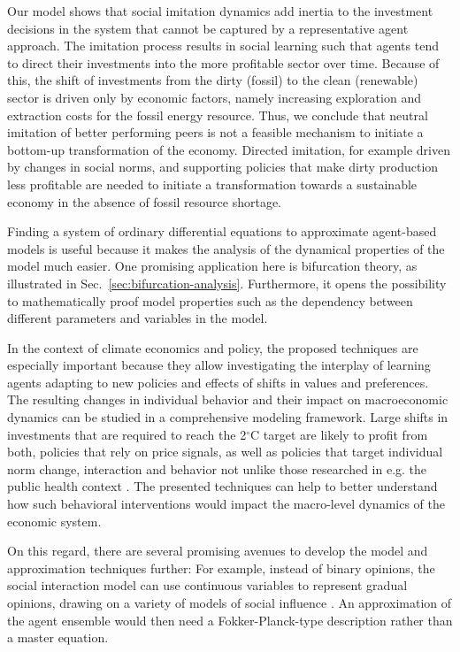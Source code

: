 Our model shows that social imitation dynamics add inertia to the investment decisions in the system that cannot be captured by a representative agent approach.
The imitation process results in social learning such that agents tend to direct their investments into the more profitable sector over time.
Because of this, the shift of investments from the dirty (fossil) to the clean (renewable) sector is driven only by economic factors, namely increasing exploration and extraction costs for the fossil energy resource.
Thus, we conclude that neutral imitation of better performing peers is not a feasible mechanism to initiate a bottom-up transformation of the economy. Directed imitation, for example driven by changes in social norms, and supporting policies that make dirty production less profitable are needed to initiate a transformation towards a sustainable economy in the absence of fossil resource shortage.

Finding a system of ordinary differential equations to approximate agent-based models is useful because it makes the analysis of the dynamical properties of the model much easier. One promising application here is bifurcation theory, as illustrated in Sec.~\ref{sec:bifurcation-analysis}.
Furthermore, it opens the possibility to mathematically proof model properties such as the dependency between different parameters and variables in the model.

In the context of climate economics and policy, the proposed techniques are especially important because they allow investigating the interplay of learning agents adapting to new policies and effects of shifts in values and preferences. The resulting changes in individual behavior and their impact on macroeconomic dynamics can be studied in a comprehensive modeling framework. 
Large shifts in investments that are required to reach the 2$^\circ$C target are likely to profit from both, policies that rely on price signals, as well as policies that target individual norm change, interaction and behavior not unlike those researched in e.g. the public health context \cite{Zhang2016, Zhang2015, Centola2011}. The presented techniques can help to better understand how such behavioral interventions would impact the macro-level dynamics of the economic system.

On this regard, there are several promising avenues to develop the model and approximation techniques further: For example, instead of binary opinions, the social interaction model can use continuous variables to represent gradual opinions, drawing on a variety of models of social influence \citep[see ref.][pp. 988 f.]{Mueller-Hansen2017}.
An approximation of the agent ensemble would then need a Fokker-Planck-type description rather than a master equation.

